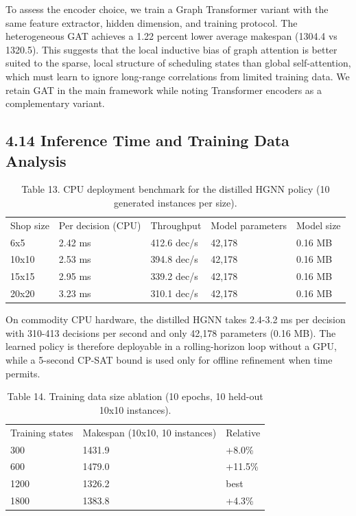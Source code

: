 \documentclass{article}
\begin{document}
To assess the encoder choice, we train a Graph Transformer variant with the same feature extractor, hidden dimension, and training protocol. The heterogeneous GAT achieves a 1.22 percent lower average makespan (1304.4 vs 1320.5). This suggests that the local inductive bias of graph attention is better suited to the sparse, local structure of scheduling states than global self-attention, which must learn to ignore long-range correlations from limited training data. We retain GAT in the main framework while noting Transformer encoders as a complementary variant.


\subsection*{4.14 Inference Time and Training Data Analysis}

\begin{table}[h]
\centering
\begin{tabular}{lllll}
\toprule
Shop size & Per decision (CPU) & Throughput & Model parameters & Model size \\
6x5 & 2.42 ms & 412.6 dec/s & 42,178 & 0.16 MB \\
10x10 & 2.53 ms & 394.8 dec/s & 42,178 & 0.16 MB \\
15x15 & 2.95 ms & 339.2 dec/s & 42,178 & 0.16 MB \\
20x20 & 3.23 ms & 310.1 dec/s & 42,178 & 0.16 MB \\
\bottomrule
\end{tabular}
\caption{Table 13. CPU deployment benchmark for the distilled HGNN policy (10 generated instances per size).}
\end{table}

On commodity CPU hardware, the distilled HGNN takes 2.4-3.2 ms per decision with 310-413 decisions per second and only 42,178 parameters (0.16 MB). The learned policy is therefore deployable in a rolling-horizon loop without a GPU, while a 5-second CP-SAT bound is used only for offline refinement when time permits.

\begin{table}[h]
\centering
\begin{tabular}{lll}
\toprule
Training states & Makespan (10x10, 10 instances) & Relative \\
300 & 1431.9 & +8.0\% \\
600 & 1479.0 & +11.5\% \\
1200 & 1326.2 & best \\
1800 & 1383.8 & +4.3\% \\
\bottomrule
\end{tabular}
\caption{Table 14. Training data size ablation (10 epochs, 10 held-out 10x10 instances).}
\end{table}
\end{document}

